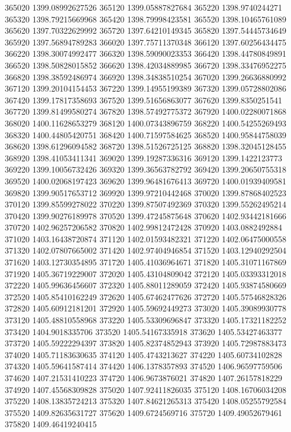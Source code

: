 {365020 1399.08992627526
365120 1399.05887827684
365220 1398.9740244271
365320 1398.79215669968
365420 1398.79998423581
365520 1398.10465761089
365620 1397.70322629992
365720 1397.64210149345
365820 1397.54445734649
365920 1397.56894789283
366020 1397.75711370348
366120 1397.60256434475
366220 1398.30074992477
366320 1398.59090023353
366420 1398.44780849891
366520 1398.50828015852
366620 1398.42034889985
366720 1398.33476952275
366820 1398.38592486974
366920 1398.34838510254
367020 1399.26636880992
367120 1399.20104154453
367220 1399.14955199389
367320 1399.05728802086
367420 1399.17817358693
367520 1399.51656863077
367620 1399.8350251541
367720 1399.81499580274
367820 1398.57492775372
367920 1400.02280071868
368020 1400.11628653279
368120 1400.07343896759
368220 1400.54255269493
368320 1400.44805420751
368420 1400.71597584625
368520 1400.95844758039
368620 1398.61296094582
368720 1398.51526725125
368820 1398.32045128455
368920 1398.41053411341
369020 1399.19287336316
369120 1399.1422123773
369220 1399.10056732426
369320 1399.36563782792
369420 1399.20650755318
369520 1400.02068197423
369620 1399.96481676413
369720 1400.01939409581
369820 1399.90517653712
369920 1399.97210442468
370020 1399.87868402523
370120 1399.85599278022
370220 1399.87507492369
370320 1399.55262495214
370420 1399.90276189978
370520 1399.47245875648
370620 1402.93442181666
370720 1402.96257206582
370820 1402.99812472428
370920 1403.0882492884
371020 1403.16438720874
371120 1402.01593482321
371220 1402.06475000558
371320 1402.07807665002
371420 1402.97404946854
371520 1403.12940292504
371620 1403.12730354895
371720 1405.41036964671
371820 1405.31071167869
371920 1405.36719229007
372020 1405.43104809042
372120 1405.03393312018
372220 1405.99636456607
372320 1405.88011289059
372420 1405.93874580669
372520 1405.85410162249
372620 1405.67462477626
372720 1405.57546828326
372820 1405.60912181201
372920 1405.59692449273
373020 1405.39089930778
373120 1405.48810558968
373220 1405.53309696847
373320 1405.17321182252
373420 1404.9018335706
373520 1405.54167335918
373620 1405.53427463377
373720 1405.59222294397
373820 1405.82374852943
373920 1405.72987883473
374020 1405.71183630635
374120 1405.4743213627
374220 1405.60734102828
374320 1405.59641587414
374420 1406.1378357893
374520 1406.96597759506
374620 1407.21531410223
374720 1406.9673876021
374820 1407.26157818229
374920 1407.45568309828
375020 1407.92411826035
375120 1408.16706034208
375220 1408.13835724213
375320 1407.84621265313
375420 1408.05255792584
375520 1409.82635631727
375620 1409.6724569716
375720 1409.49052679461
375820 1409.46419240415
}
